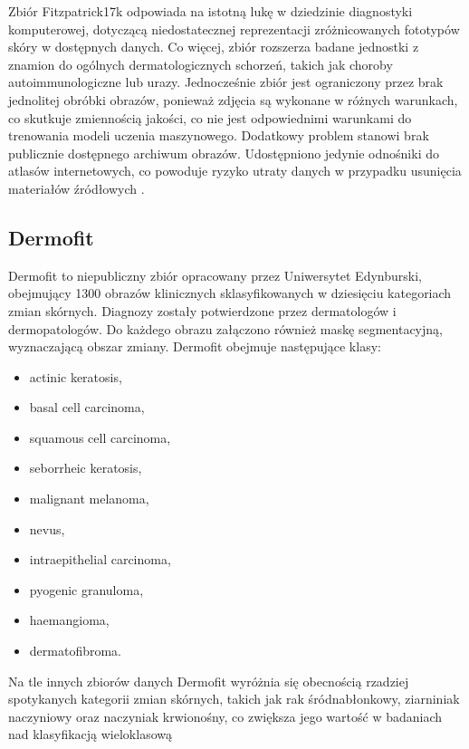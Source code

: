 Zbiór Fitzpatrick17k odpowiada na istotną lukę w dziedzinie diagnostyki komputerowej, dotyczącą niedostatecznej reprezentacji zróżnicowanych fototypów skóry w dostępnych danych.
Co więcej, zbiór rozszerza badane jednostki z znamion do ogólnych dermatologicznych schorzeń, takich jak choroby autoimmunologiczne lub urazy.
Jednocześnie zbiór jest ograniczony przez brak jednolitej obróbki obrazów, ponieważ zdjęcia są wykonane w różnych warunkach, co skutkuje zmiennością jakości, co nie jest odpowiednimi warunkami do trenowania modeli uczenia maszynowego.
Dodatkowy problem stanowi brak publicznie dostępnego archiwum obrazów.
Udostępniono jedynie odnośniki do atlasów internetowych, co powoduje ryzyko utraty danych w przypadku usunięcia materiałów źródłowych \cite{groh2021evaluating}.

\subsection{Dermofit}
Dermofit to niepubliczny zbiór opracowany przez Uniwersytet Edynburski, obejmujący 1300 obrazów klinicznych sklasyfikowanych w dziesięciu kategoriach zmian skórnych.
Diagnozy zostały potwierdzone przez dermatologów i dermopatologów.
Do każdego obrazu załączono również maskę segmentacyjną, wyznaczającą obszar zmiany.
Dermofit obejmuje następujące klasy:
\begin{itemize}
	\item actinic keratosis,
	\item basal cell carcinoma,
	\item squamous cell carcinoma,
	\item seborrheic keratosis,
	\item malignant melanoma,
	\item nevus,
	\item intraepithelial carcinoma,
	\item pyogenic granuloma,
	\item haemangioma,
	\item dermatofibroma.
\end{itemize}
Na tle innych zbiorów danych Dermofit wyróżnia się obecnością rzadziej spotykanych kategorii zmian skórnych, takich jak rak śródnabłonkowy, ziarniniak naczyniowy oraz naczyniak krwionośny, co zwiększa jego wartość w badaniach nad klasyfikacją wieloklasową \cite{Dermofit, inbook}

